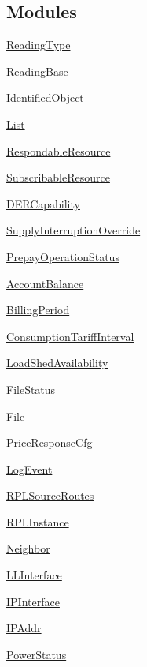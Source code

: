 \subsection*{Modules}
\begin{DoxyCompactItemize}
\item 
\hyperlink{group__ReadingType}{Reading\+Type}
\item 
\hyperlink{group__ReadingBase}{Reading\+Base}
\item 
\hyperlink{group__IdentifiedObject}{Identified\+Object}
\item 
\hyperlink{group__List}{List}
\item 
\hyperlink{group__RespondableResource}{Respondable\+Resource}
\item 
\hyperlink{group__SubscribableResource}{Subscribable\+Resource}
\item 
\hyperlink{group__DERCapability}{D\+E\+R\+Capability}
\item 
\hyperlink{group__SupplyInterruptionOverride}{Supply\+Interruption\+Override}
\item 
\hyperlink{group__PrepayOperationStatus}{Prepay\+Operation\+Status}
\item 
\hyperlink{group__AccountBalance}{Account\+Balance}
\item 
\hyperlink{group__BillingPeriod}{Billing\+Period}
\item 
\hyperlink{group__ConsumptionTariffInterval}{Consumption\+Tariff\+Interval}
\item 
\hyperlink{group__LoadShedAvailability}{Load\+Shed\+Availability}
\item 
\hyperlink{group__FileStatus}{File\+Status}
\item 
\hyperlink{group__File}{File}
\item 
\hyperlink{group__PriceResponseCfg}{Price\+Response\+Cfg}
\item 
\hyperlink{group__LogEvent}{Log\+Event}
\item 
\hyperlink{group__RPLSourceRoutes}{R\+P\+L\+Source\+Routes}
\item 
\hyperlink{group__RPLInstance}{R\+P\+L\+Instance}
\item 
\hyperlink{group__Neighbor}{Neighbor}
\item 
\hyperlink{group__LLInterface}{L\+L\+Interface}
\item 
\hyperlink{group__IPInterface}{I\+P\+Interface}
\item 
\hyperlink{group__IPAddr}{I\+P\+Addr}
\item 
\hyperlink{group__PowerStatus}{Power\+Status}

\end{DoxyCompactItemize}
